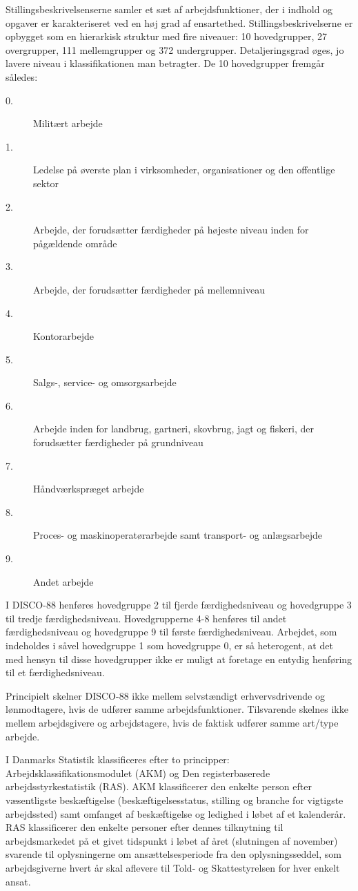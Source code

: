 Stillingsbeskrivelsenserne samler et sæt af arbejdsfunktioner, der i indhold og opgaver er karakteriseret ved en høj grad af ensartethed. Stillingsbeskrivelserne er opbygget som en hierarkisk struktur med fire niveauer: 10 hovedgrupper, 27 overgrupper, 111 mellemgrupper og 372 undergrupper. Detaljeringsgrad øges, jo lavere niveau i klassifikationen man betragter. De 10 hovedgrupper fremgår således:
\begin{description}
  \item[0.] Militært arbejde
  \item[1.] Ledelse på øverste plan i virksomheder, organisationer og den offentlige
sektor
  \item[2.] Arbejde, der forudsætter færdigheder på højeste niveau inden for pågældende område
  \item[3.] Arbejde, der forudsætter færdigheder på mellemniveau
  \item[4.] Kontorarbejde
  \item[5.] Salgs-, service- og omsorgsarbejde
  \item[6.] Arbejde inden for landbrug, gartneri, skovbrug, jagt og fiskeri, der forudsætter færdigheder på grundniveau
  \item[7.] Håndværkspræget arbejde
  \item[8.] Proces- og maskinoperatørarbejde samt transport- og anlægsarbejde
  \item[9.] Andet arbejde
\end{description}

I DISCO-88 henføres hovedgruppe 2 til fjerde færdighedsniveau og hovedgruppe 3 til tredje færdighedsniveau. Hovedgrupperne 4-8 henføres til andet færdighedsniveau og hovedgruppe 9 til første færdighedsniveau. Arbejdet, som indeholdes i såvel hovedgruppe 1 som hovedgruppe 0, er så heterogent, at det med hensyn til disse hovedgrupper ikke er muligt at foretage en entydig henføring til et færdighedsniveau.

Principielt skelner DISCO-88 ikke mellem selvstændigt erhvervsdrivende og lønmodtagere, hvis de udfører samme arbejdsfunktioner. Tilsvarende skelnes ikke mellem arbejdsgivere og arbejdstagere, hvis de faktisk udfører samme art/type
arbejde. 

I Danmarks Statistik klassificeres efter to principper: Arbejdsklassifikationsmodulet (AKM) og Den registerbaserede arbejdsstyrkestatistik (RAS). AKM klassificerer den enkelte person efter væsentligste beskæftigelse (beskæftigelsesstatus, stilling og branche for vigtigste arbejdssted) samt omfanget af beskæftigelse og ledighed i løbet af et kalenderår. RAS klassificerer den enkelte personer efter dennes tilknytning til arbejdsmarkedet på et givet tidspunkt i løbet af året (slutningen af november) svarende til oplysningerne om ansættelsesperiode fra den oplysningsseddel, som arbejdsgiverne hvert år skal aflevere til Told- og Skattestyrelsen for hver enkelt ansat.


